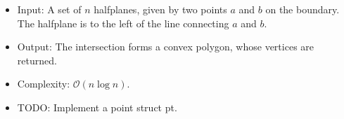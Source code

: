 \begin{itemize}
  \item Input: A set of $n$ halfplanes, given by two points $a$ and $b$ on the boundary. The halfplane is to the left of the line connecting $a$ and $b$.
  \item Output: The intersection forms a convex polygon, whose vertices are returned.
  \item Complexity: $\mathcal{O}(n\log n)$.
  \item TODO: Implement a point struct pt.
\end{itemize}